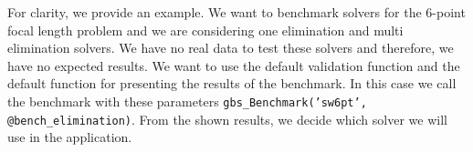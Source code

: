 For clarity, we provide an example. We want to benchmark solvers for the 6-point focal length problem \cite{6pt} and we are considering one elimination and multi elimination solvers. We have no real data to test these solvers and therefore, we have no expected results. We want to use the default validation function and the default function for presenting the results of the benchmark. In this case we call the benchmark with these parameters \texttt{gbs\_Benchmark('sw6pt', @bench\_elimination)}. From the shown results, we decide which solver we will use in the application.
